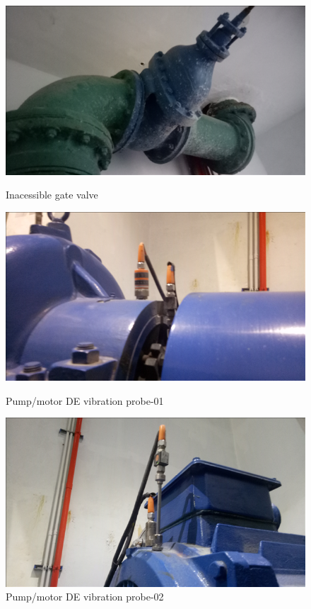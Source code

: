 \begin{figure}[!htb]
		\begin{minipage}[b]{0.3\linewidth}
		\centering
		\includegraphics[width=\textwidth]{figures/ch043_inaccesible_gate_valve}
		\caption{Inacessible gate valve}
		\label{ch043_inaccesible_gate_valve}
	\end{minipage}
	\hspace{0.05cm}
	\begin{minipage}[b]{0.3\linewidth}
		\centering
		\includegraphics[width=\textwidth]{figures/ch043_vib_probeA}
		\caption{Pump/motor DE vibration probe-01}
		\label{ch043_vib_probea}
	\end{minipage}
	\hspace{0.05cm}
	\begin{minipage}[b]{0.3\linewidth}
		\centering
		\includegraphics[width=\textwidth]{figures/ch043_vib_probeB}
		\caption{Pump/motor DE vibration probe-02}
		\label{ch043_vib_probeb}
	\end{minipage}

\end{figure}


